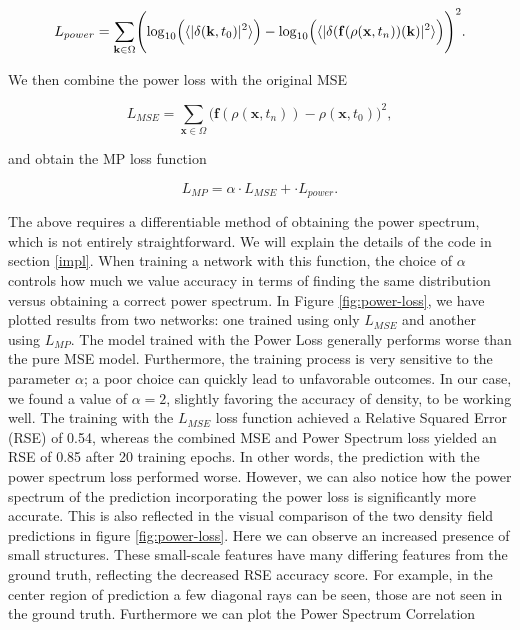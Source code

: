 \documentclass{article}
\begin{document}
\begin{equation}
    L_{power} = \sum_{\mathbf{k} \in \Omega} \Biggl(  \log_{10} \Bigl( \langle |\delta(\mathbf{k}, t_0)|^2 \rangle \Bigr) - \log_{10} \Bigl( \langle |\delta(\mathbf{f}(\rho(\mathbf{x}, t_n))(\mathbf{k})|^2 \rangle \Bigr) \Biggr)^2.
\end{equation}

We then combine the power loss with the original MSE

\begin{equation}
    L_{MSE} = \sum_{\mathbf{x} \in  \Omega} \Biggl(\mathbf{f}(\rho(\mathbf{x}, t_{n})) - \rho(\mathbf{x}, t_0)\Biggr)^2,
\end{equation}

and obtain the MP loss function

\begin{equation}
    L_{MP} = \alpha \cdot L_{MSE} + \cdot L_{power}.
\end{equation}

The above requires a differentiable method of obtaining the power spectrum, which is not entirely straightforward. We will explain the details of the code in section \ref{impl}. When training a network with this function, the choice of $\alpha$ controls how much we value accuracy in terms of finding the same distribution versus obtaining a correct power spectrum. In Figure \ref{fig:power-loss}, we have plotted results from two networks: one trained using only $L_{MSE}$ and another using $L_{MP}$. The model trained with the Power Loss generally performs worse than the pure MSE model. Furthermore, the training process is very sensitive to the parameter $\alpha$; a poor choice can quickly lead to unfavorable outcomes. In our case, we found a value of $\alpha=2$,  slightly favoring the accuracy of density, to be working well. The training with the $L_{MSE}$ loss function achieved a Relative Squared Error (RSE) of 0.54, whereas the combined MSE and Power Spectrum loss yielded an RSE of 0.85 after 20 training epochs. In other words, the prediction with the power spectrum loss performed worse. However, we can also notice how the power spectrum of the prediction incorporating the power loss is significantly more accurate. This is also reflected in the visual comparison of the two density field predictions in figure \ref{fig:power-loss}. Here we can observe an increased presence of small structures. These small-scale features have many differing features from the ground truth, reflecting the decreased RSE accuracy score. For example, in the center region of prediction a few diagonal rays can be seen, those are not seen in the ground truth. Furthermore we can plot the Power Spectrum Correlation 
\end{document}
